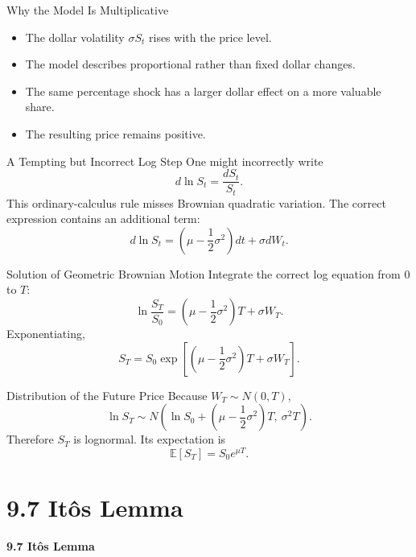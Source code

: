 \documentclass[aspectratio=169]{beamer}
\newcommand{\E}{\mathbb{E}}
\begin{document}
\begin{frame}[t]{Why the Model Is Multiplicative}
\justifying
\begin{itemize}
\item The dollar volatility $\sigma S_t$ rises with the price level.
\item The model describes proportional rather than fixed dollar changes.
\item The same percentage shock has a larger dollar effect on a more valuable share.
\item The resulting price remains positive.
\end{itemize}
\end{frame}

\begin{frame}[t]{A Tempting but Incorrect Log Step}
\justifying
One might incorrectly write
\[d\ln S_t=\frac{dS_t}{S_t}.\]
This ordinary-calculus rule misses Brownian quadratic variation. The correct expression contains an additional term:
\[d\ln S_t=\left(\mu-\frac{1}{2}\sigma^2\right)dt+\sigma dW_t.\]
\end{frame}

\begin{frame}[t]{Solution of Geometric Brownian Motion}
\justifying
Integrate the correct log equation from $0$ to $T$:
\[\ln\frac{S_T}{S_0}=\left(\mu-\frac{1}{2}\sigma^2\right)T+\sigma W_T.\]
Exponentiating,
\[S_T=S_0\exp\left[\left(\mu-\frac{1}{2}\sigma^2\right)T+\sigma W_T\right].\]
\end{frame}

\begin{frame}[t]{Distribution of the Future Price}
\justifying
Because $W_T\sim N(0,T)$,
\[\ln S_T\sim N\left(\ln S_0+\left(\mu-\frac{1}{2}\sigma^2\right)T,\ \sigma^2T\right).\]
Therefore $S_T$ is lognormal. Its expectation is
\[\E[S_T]=S_0e^{\mu T}.\]
\end{frame}

\section{9.7 It\^o\textquotesingle s Lemma}
\begin{frame}[plain]
\centering\vfill
{\color{TitleBlue}\Large\bfseries 9.7 It\^o\textquotesingle s Lemma}\par
\vspace{0.5cm}{\large The stochastic version of the chain rule}\par
\vfill\end{frame}
\end{document}
